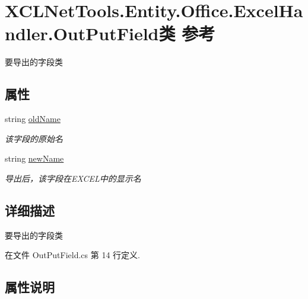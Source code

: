 \hypertarget{class_x_c_l_net_tools_1_1_entity_1_1_office_1_1_excel_handler_1_1_out_put_field}{}\section{X\+C\+L\+Net\+Tools.\+Entity.\+Office.\+Excel\+Handler.\+Out\+Put\+Field类 参考}
\label{class_x_c_l_net_tools_1_1_entity_1_1_office_1_1_excel_handler_1_1_out_put_field}


要导出的字段类  


\subsection*{属性}
\begin{DoxyCompactItemize}
\item 
string \hyperlink{class_x_c_l_net_tools_1_1_entity_1_1_office_1_1_excel_handler_1_1_out_put_field_a6f62cc17246410ac6f6a352cd04bc1a2}{old\+Name}
\begin{DoxyCompactList}\small\item\em 该字段的原始名 \end{DoxyCompactList}\item 
string \hyperlink{class_x_c_l_net_tools_1_1_entity_1_1_office_1_1_excel_handler_1_1_out_put_field_a5889d2738a4a65d809b67457e37429fd}{new\+Name}
\begin{DoxyCompactList}\small\item\em 导出后，该字段在\+E\+X\+C\+E\+L中的显示名 \end{DoxyCompactList}\end{DoxyCompactItemize}


\subsection{详细描述}
要导出的字段类 



在文件 Out\+Put\+Field.\+cs 第 14 行定义.



\subsection{属性说明}
\mbox{\label{class_x_c_l_net_tools_1_1_entity_1_1_office_1_1_excel_handler_1_1_out_put_field_a5889d2738a4a65d809b67457e37429fd}} 
